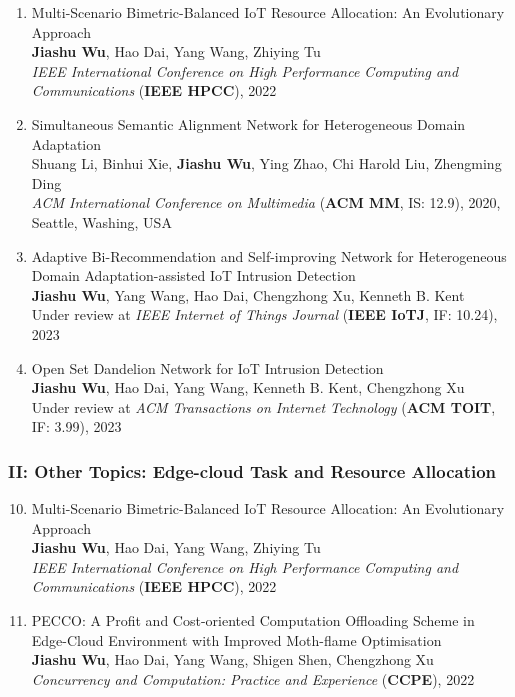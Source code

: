 \documentclass[letterpaper,11pt]{article}
\begin{document}
\begin{enumerate}
  \item Multi-Scenario Bimetric-Balanced IoT Resource Allocation: An Evolutionary Approach\\
  \textbf{Jiashu Wu}, Hao Dai, Yang Wang\textsuperscript{\Letter}, Zhiying Tu\\
  \textit{IEEE International Conference on High Performance Computing and Communications} (\textbf{IEEE HPCC}), 2022

  \item Simultaneous Semantic Alignment Network for Heterogeneous Domain Adaptation\\
  Shuang Li, Binhui Xie, \textbf{Jiashu Wu}, Ying Zhao, Chi Harold Liu\textsuperscript{\Letter}, Zhengming Ding\\
  \textit{ACM International Conference on Multimedia} (\textbf{ACM MM}, IS: 12.9), 2020, Seattle, Washing, USA

  \item Adaptive Bi-Recommendation and Self-improving Network for Heterogeneous Domain Adaptation-assisted IoT Intrusion Detection\\
  \textbf{Jiashu Wu}, Yang Wang\textsuperscript{\Letter}, Hao Dai, Chengzhong Xu, Kenneth B. Kent\\
  Under review at \textit{IEEE Internet of Things Journal} (\textbf{IEEE IoTJ}, IF: 10.24), 2023

  \item Open Set Dandelion Network for IoT Intrusion Detection\\
  \textbf{Jiashu Wu}, Hao Dai, Yang Wang\textsuperscript{\Letter}, Kenneth B. Kent, Chengzhong Xu\\
  Under review at \textit{ACM Transactions on Internet Technology} (\textbf{ACM TOIT}, IF: 3.99), 2023
\end{enumerate}

\iffalse
\subsubsection*{II: Other Topics: Edge-cloud Task and Resource Allocation}
\begin{enumerate}
  \setcounter{enumi}{9}
  \item Multi-Scenario Bimetric-Balanced IoT Resource Allocation: An Evolutionary Approach\\
  \textbf{Jiashu Wu}, Hao Dai, Yang Wang\textsuperscript{\Letter}, Zhiying Tu\\
  \textit{IEEE International Conference on High Performance Computing and Communications} (\textbf{IEEE HPCC}), 2022

  \item PECCO: A Profit and Cost-oriented Computation Offloading Scheme in Edge-Cloud Environment with Improved Moth-flame Optimisation\\
  \textbf{Jiashu Wu}, Hao Dai, Yang Wang\textsuperscript{\Letter}, Shigen Shen, Chengzhong Xu\\
  \textit{Concurrency and Computation: Practice and Experience} (\textbf{CCPE}), 2022
\end{enumerate}
\end{document}
